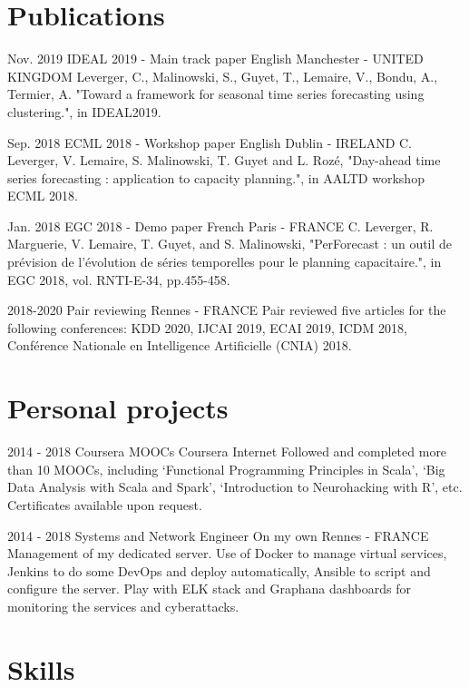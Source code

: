 \documentclass[11pt,a4paper,sans]{moderncv}        %
\begin{document}
\section{Publications}

\cventry
    {Nov. 2019}
    {IDEAL 2019 - Main track paper}
    {English}
    {Manchester - UNITED KINGDOM}
    {}
    {Leverger, C., Malinowski, S., Guyet, T., Lemaire, V., Bondu, A., Termier, A. "Toward a framework for seasonal time series forecasting using clustering.", in IDEAL2019.}

\cventry
    {Sep. 2018}
    {ECML 2018 - Workshop paper}
    {English}
    {Dublin - IRELAND}
    {}
    {C. Leverger, V. Lemaire, S. Malinowski, T. Guyet and L. Rozé, "Day-ahead time series forecasting : application to capacity planning.", in AALTD workshop ECML 2018.}

\cventry
    {Jan. 2018}
    {EGC 2018 - Demo paper}
    {French}
    {Paris - FRANCE}
    {}
    {C. Leverger, R. Marguerie, V. Lemaire, T. Guyet, and S. Malinowski, "PerForecast : un outil de prévision de l'évolution de séries temporelles pour le planning capacitaire.", in EGC 2018, vol. RNTI-E-34, pp.455-458.}
    
\cventry
    {2018-2020}
    {Pair reviewing}
    {}
    {Rennes - FRANCE}
    {}
    {Pair reviewed five articles for the following conferences: KDD 2020, IJCAI 2019, ECAI 2019, ICDM 2018, Conférence Nationale en Intelligence Artificielle (CNIA) 2018.}

\section{Personal projects}

\cventry
	{2014 - 2018}
    {Coursera MOOCs}
    {Coursera}
    {Internet}
    {}
    {Followed and completed more than 10 MOOCs, including ‘Functional Programming Principles in Scala’, ‘Big Data Analysis with Scala and Spark’, ‘Introduction to Neurohacking with R’, etc. Certificates available upon request.}
    
\cventry
	{2014 - 2018}
    {Systems and Network Engineer}
    {On my own}
    {Rennes - FRANCE}
    {}
    {Management of my dedicated server. 
    Use of Docker to manage virtual services, Jenkins to do some DevOps and deploy automatically, Ansible to script and configure the server. Play with ELK stack and Graphana dashboards for monitoring the services and cyberattacks.
    }
   
\section{Skills}
\end{document}
